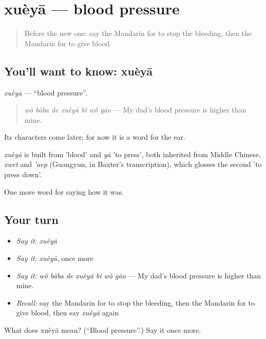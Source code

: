 \section[xuèyā]{xuèyā — blood pressure}

\label{lesson:ZH-C479-xueya}



\begin{quote}
Before the new one: say the Mandarin for to stop the bleeding, then the Mandarin for to give blood.
\end{quote}

\subsection*{You'll want to know: xuèyā}
\emph{xuèyā} — \textquotedblleft{}blood pressure\textquotedblright{}.

\begin{quote}
\emph{wǒ bàba de xuèyā bǐ wǒ gāo} — My dad's blood pressure is higher than mine.
\end{quote}

Its characters come later; for now it is a word for the ear.

\begin{cousinweb}
\emph{xuèyā} is built from  'blood' and \emph{yā} 'to press', both inherited from Middle Chinese, \emph{xwet} and \emph{'aep} (Guangyun, in Baxter's transcription), which glosses the second 'to press down'.
\end{cousinweb}

\begin{grammarlens}[title={What you've built}]
One more word for saying how it was.
\end{grammarlens}

\subsection*{Your turn}
\begin{itemize}
\raggedright
  \item \emph{Say it:} \emph{xuèyā}
  \item \emph{Say it:} \emph{xuèyā}, once more
  \item \emph{Say it:} \emph{wǒ bàba de xuèyā bǐ wǒ gāo} — My dad's blood pressure is higher than mine.
  \item \emph{Recall:} say the Mandarin for to stop the bleeding, then the Mandarin for to give blood, then say \emph{xuèyā} again
\end{itemize}

\begin{tcolorbox}[breakable,colback=teal!4,colframe=teal!35!black,title={Before you move on}]
What does xuèyā mean? (\textquotedblleft{}Blood pressure\textquotedblright{}.) Say it once more.
\end{tcolorbox}
